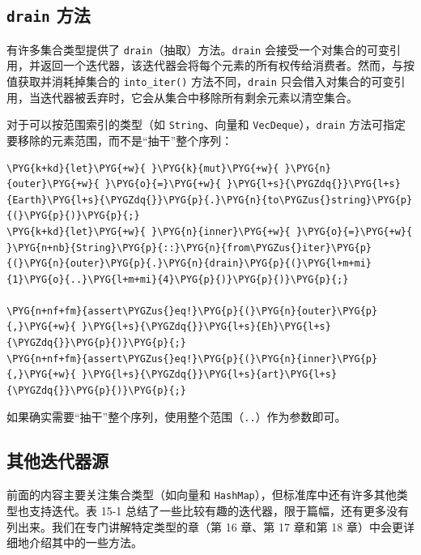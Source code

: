 \subsection{\texttt{drain} 方法}

有许多集合类型提供了 \texttt{drain}（抽取）方法。\texttt{drain} 会接受一个对集合的可变引用，并返回一个迭代器，该迭代器会将每个元素的所有权传给消费者。然而，与按值获取并消耗掉集合的 \texttt{into\_iter()} 方法不同，\texttt{drain} 只会借入对集合的可变引用，当迭代器被丢弃时，它会从集合中移除所有剩余元素以清空集合。

对于可以按范围索引的类型（如 \texttt{String}、向量和 \texttt{VecDeque}），\texttt{drain} 方法可指定要移除的元素范围，而不是“抽干”整个序列：

\begin{Verbatim}[commandchars=\\\{\},breaklines=true,breakanywhere=true,fontsize=\codefont,xleftmargin=17bp]
\PYG{k+kd}{let}\PYG{+w}{ }\PYG{k}{mut}\PYG{+w}{ }\PYG{n}{outer}\PYG{+w}{ }\PYG{o}{=}\PYG{+w}{ }\PYG{l+s}{\PYGZdq{}}\PYG{l+s}{Earth}\PYG{l+s}{\PYGZdq{}}\PYG{p}{.}\PYG{n}{to\PYGZus{}string}\PYG{p}{(}\PYG{p}{)}\PYG{p}{;}
\PYG{k+kd}{let}\PYG{+w}{ }\PYG{n}{inner}\PYG{+w}{ }\PYG{o}{=}\PYG{+w}{ }\PYG{n+nb}{String}\PYG{p}{::}\PYG{n}{from\PYGZus{}iter}\PYG{p}{(}\PYG{n}{outer}\PYG{p}{.}\PYG{n}{drain}\PYG{p}{(}\PYG{l+m+mi}{1}\PYG{o}{..}\PYG{l+m+mi}{4}\PYG{p}{)}\PYG{p}{)}\PYG{p}{;}

\PYG{n+nf+fm}{assert\PYGZus{}eq!}\PYG{p}{(}\PYG{n}{outer}\PYG{p}{,}\PYG{+w}{ }\PYG{l+s}{\PYGZdq{}}\PYG{l+s}{Eh}\PYG{l+s}{\PYGZdq{}}\PYG{p}{)}\PYG{p}{;}
\PYG{n+nf+fm}{assert\PYGZus{}eq!}\PYG{p}{(}\PYG{n}{inner}\PYG{p}{,}\PYG{+w}{ }\PYG{l+s}{\PYGZdq{}}\PYG{l+s}{art}\PYG{l+s}{\PYGZdq{}}\PYG{p}{)}\PYG{p}{;}
\end{Verbatim}

如果确实需要“抽干”整个序列，使用整个范围（\texttt{..}）作为参数即可。

\subsection{其他迭代器源}

前面的内容主要关注集合类型（如向量和 \texttt{HashMap}），但标准库中还有许多其他类型也支持迭代。表 15-1 总结了一些比较有趣的迭代器，限于篇幅，还有更多没有列出来。我们在专门讲解特定类型的章（第 16 章、第 17 章和第 18 章）中会更详细地介绍其中的一些方法。



